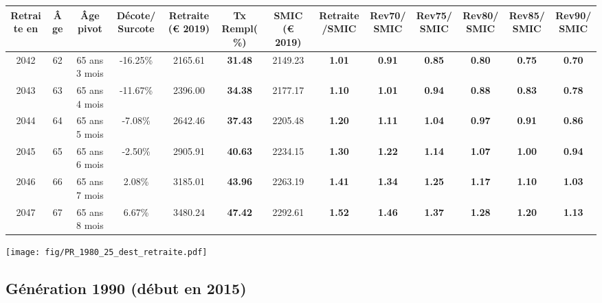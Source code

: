 { \scriptsize \begin{center} 
\begin{tabular}[htb]{|c|c||c|c||c|c||c||c|c|c|c|c|c|} 
\hline 
 Retraite en &  Âge &  Âge pivot &  Décote/Surcote &  Retraite (\euro{} 2019) &  Tx Rempl(\%) &  SMIC (\euro{} 2019) &  Retraite/SMIC &  Rev70/SMIC &  Rev75/SMIC &  Rev80/SMIC &  Rev85/SMIC &  Rev90/SMIC \\ 
\hline \hline 
 2042 &  62 &  65 ans 3 mois &  -16.25\% &  2165.61 &  {\bf 31.48} &  2149.23 &  {\bf 1.01} &  {\bf {\color{red} 0.91}} &  {\bf {\color{red} 0.85}} &  {\bf {\color{red} 0.80}} &  {\bf {\color{red} 0.75}} &  {\bf {\color{red} 0.70}} \\ 
\hline 
 2043 &  63 &  65 ans 4 mois &  -11.67\% &  2396.00 &  {\bf 34.38} &  2177.17 &  {\bf 1.10} &  {\bf 1.01} &  {\bf {\color{red} 0.94}} &  {\bf {\color{red} 0.88}} &  {\bf {\color{red} 0.83}} &  {\bf {\color{red} 0.78}} \\ 
\hline 
 2044 &  64 &  65 ans 5 mois &  -7.08\% &  2642.46 &  {\bf 37.43} &  2205.48 &  {\bf 1.20} &  {\bf 1.11} &  {\bf 1.04} &  {\bf {\color{red} 0.97}} &  {\bf {\color{red} 0.91}} &  {\bf {\color{red} 0.86}} \\ 
\hline 
 2045 &  65 &  65 ans 6 mois &  -2.50\% &  2905.91 &  {\bf 40.63} &  2234.15 &  {\bf 1.30} &  {\bf 1.22} &  {\bf 1.14} &  {\bf 1.07} &  {\bf 1.00} &  {\bf {\color{red} 0.94}} \\ 
\hline 
 2046 &  66 &  65 ans 7 mois &  2.08\% &  3185.01 &  {\bf 43.96} &  2263.19 &  {\bf 1.41} &  {\bf 1.34} &  {\bf 1.25} &  {\bf 1.17} &  {\bf 1.10} &  {\bf 1.03} \\ 
\hline 
 2047 &  67 &  65 ans 8 mois &  6.67\% &  3480.24 &  {\bf 47.42} &  2292.61 &  {\bf 1.52} &  {\bf 1.46} &  {\bf 1.37} &  {\bf 1.28} &  {\bf 1.20} &  {\bf 1.13} \\ 
\hline 
\hline 
\end{tabular} 
\end{center} } 

 \begin{center}\texttt{[image: fig/PR\_1980\_25\_dest\_retraite.pdf]}\end{center} \label{fig/PR_1980_25_dest_retraite.pdf} 

\newpage 
 
\subsection{Génération 1990 (début en 2015)} 


